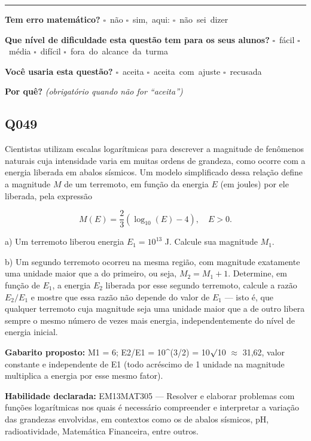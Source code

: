 \documentclass[11pt,a4paper]{article}
\begin{document}
\noindent\rule{\linewidth}{0.4pt}
\textbf{Tem erro matemático?}\quad
\mbox{$\square$~não} \quad \mbox{$\square$~sim, aqui:} \underline{\hspace{5cm}}
\quad \mbox{$\square$~não sei dizer}

\textbf{Que nível de dificuldade esta questão tem para os seus alunos?}\quad
\mbox{$\square$~fácil} \quad \mbox{$\square$~média} \quad
\mbox{$\square$~difícil} \quad \mbox{$\square$~fora do alcance da turma}

\textbf{Você usaria esta questão?}\quad
\mbox{$\square$~aceita} \quad \mbox{$\square$~aceita com ajuste} \quad
\mbox{$\square$~recusada}

\textbf{Por quê?} \emph{(obrigatório quando não for ``aceita'')}

\underline{\hspace{\linewidth}}

\underline{\hspace{\linewidth}}
\vspace{0.6em}

\begin{samepage}
\subsection*{Q049}
Cientistas utilizam escalas logarítmicas para descrever a magnitude de fenômenos naturais cuja intensidade varia em muitas ordens de grandeza, como ocorre com a energia liberada em abalos sísmicos. Um modelo simplificado dessa relação define a magnitude $M$ de um terremoto, em função da energia $E$ (em joules) por ele liberada, pela expressão

$$M(E) = \frac{2}{3}\left(\log_{10}(E) - 4\right), \quad E > 0.$$

a) Um terremoto liberou energia $E_1 = 10^{13}$ J. Calcule sua magnitude $M_1$.

b) Um segundo terremoto ocorreu na mesma região, com magnitude exatamente uma unidade maior que a do primeiro, ou seja, $M_2 = M_1 + 1$. Determine, em função de $E_1$, a energia $E_2$ liberada por esse segundo terremoto, calcule a razão $E_2/E_1$ e mostre que essa razão não depende do valor de $E_1$ — isto é, que qualquer terremoto cuja magnitude seja uma unidade maior que a de outro libera sempre o mesmo número de vezes mais energia, independentemente do nível de energia inicial.

\textbf{Gabarito proposto:} M1 = 6; E2/E1 = 10\textasciicircum{}(3/2) = 10$\surd$10 $\approx$ 31,62, valor constante e independente de E1 (todo acréscimo de 1 unidade na magnitude multiplica a energia por esse mesmo fator).

\textbf{Habilidade declarada:} EM13MAT305 --- Resolver e elaborar problemas com funções logarítmicas nos quais é necessário compreender e interpretar a variação das grandezas envolvidas, em contextos como os de abalos sísmicos, pH, radioatividade, Matemática Financeira, entre outros.
\end{samepage}
\end{document}
